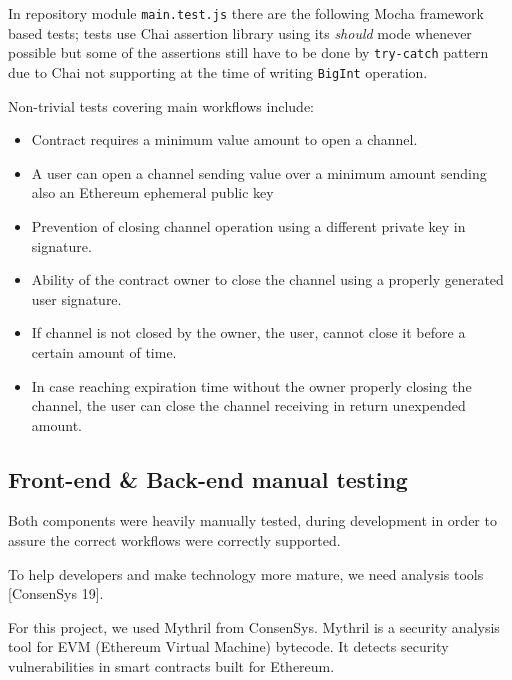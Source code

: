 \documentclass[12pt]{amsart}
\begin{document}
\begin{multicols}{2}
\vspace{0.35cm}

In repository\cite{state-channel-contract-a} module
\texttt{main.test.js} there are the following Mocha
framework\cite{mocha} based tests; tests use Chai assertion
library\cite{chai} using its \textit{should} mode whenever
possible but some of the assertions still have to be done
by \texttt{try-catch} pattern due to Chai not supporting
at the time of writing \texttt{BigInt} operation.

\vspace{0.35cm}

Non-trivial tests covering main workflows include:
\begin{itemize}
\item Contract requires a minimum value amount to open a channel.
\item A user can open a channel sending value over a minimum amount sending
  also an Ethereum ephemeral public key
\item Prevention of closing channel operation using a different private key
  in signature.
\item Ability of the contract owner to close the channel using a properly
  generated user signature.
\item If channel is not closed by the owner, the user, cannot close it
  before a certain amount of time.
\item In case reaching expiration time without the owner properly closing the channel,
  the user can close the channel receiving in return unexpended amount.
\end{itemize}

\subsection{Front-end \& Back-end manual testing}

\vspace{0.35cm}

Both components were heavily manually tested, during development
in order to assure the correct workflows were correctly supported.

\vspace{0.35cm}

To help developers and make technology more mature,
we need analysis tools [ConsenSys 19].

\vspace{0.35cm}

For this project, we used Mythril from ConsenSys. Mythril is a
security analysis tool for EVM (Ethereum Virtual Machine) bytecode.
It detects security vulnerabilities in smart contracts built for Ethereum.


\end{multicols}
\end{document}
